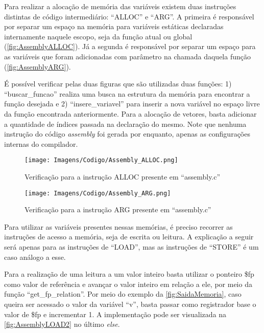 \documentclass[
	12pt,				%
	oneside,
	a4paper,			%
	english,			%
	french,				%
	spanish,			%
	brazil,				%
	]{abntex2}
\begin{document}
Para realizar a alocação de memória das variáveis existem duas instruções distintas de código intermediário: ``ALLOC'' e ``ARG''. A primeira é responsável por separar um espaço na memória para variáveis estáticas declaradas internamente naquele escopo, seja da função atual ou global (\autoref{fig:AssemblyALLOC}). Já a segunda é responsável por separar um espaço para as variáveis que foram adicionadas com parâmetro na chamada daquela função (\autoref{fig:AssemblyARG}). 

É possível verificar pelas duas figuras que são utilizadas duas funções: 1) \nohyphens{``buscar\_funcao''} realiza uma busca na estrutura da memória para encontrar a função desejada e 2) ``insere\_variavel'' para inserir a nova variável no espaço livre da função encontrada anteriormente. Para a alocação de vetores, basta adicionar a quantidade de índices passada na declaração do mesmo. Note que nenhuma instrução do código \emph{assembly} foi gerada por enquanto, apenas as configurações internas do compilador.

\begin{figure}[htbp]
\centering 
\caption{Verificação para a instrução ALLOC presente em \nohyphens{``assembly.c''}} 
\label{fig:AssemblyALLOC}
\graphicspath{ {./Imagens/} } 
\texttt{[image: Imagens/Codigo/Assembly\_ALLOC.png]}
\end{figure}


\begin{figure}[htbp]
\centering 
\caption{Verificação para a instrução ARG presente em \nohyphens{``assembly.c''}} 
\label{fig:AssemblyARG}
\graphicspath{ {./Imagens/} } 
\texttt{[image: Imagens/Codigo/Assembly\_ARG.png]}
\end{figure}

Para utilizar as variáveis presentes nessas memórias, é preciso recorrer as instruções de acesso a memória, seja de escrita ou leitura. A explicação a seguir será apenas para as instruções de ``LOAD'', mas as instruções de ``STORE'' é um caso análogo a esse.

Para a realização de uma leitura a um valor inteiro basta utilizar o ponteiro \$fp como valor de referência e avançar o valor inteiro em relação a ele, por meio da função ``get\_fp\_relation''. Por meio do exemplo da \autoref{fig:SaidaMemoria}, caso queira ser acessado o valor da variável ``v'', basta passar como registrador base o valor de \$fp e incrementar 1. A implementação pode ser visualizada na \autoref{fig:AssemblyLOAD2} no último \emph{else}.
\end{document}

